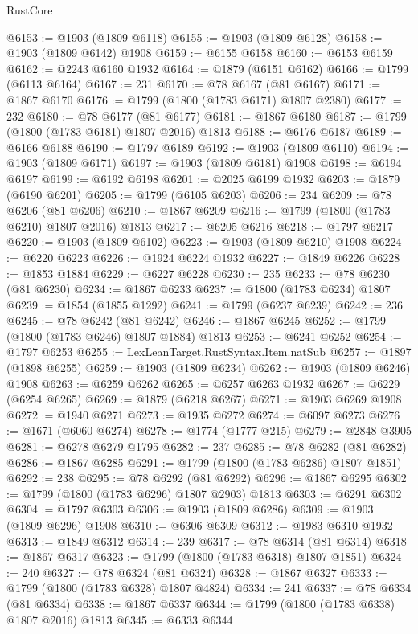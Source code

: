 \begin{lexlean}{RustCore}
\begin{coremodule}
@6153 := @1903 (@1809 @6118)
@6155 := @1903 (@1809 @6128)
@6158 := @1903 (@1809 @6142) @1908
@6159 := @6155 @6158
@6160 := @6153 @6159
@6162 := @2243 @6160 @1932
@6164 := @1879 (@6151 @6162)
@6166 := @1799 (@6113 @6164)
@6167 := 231
@6170 := @78 @6167 (@81 @6167)
@6171 := @1867 @6170
@6176 := @1799 (@1800 (@1783 @6171) @1807 @2380)
@6177 := 232
@6180 := @78 @6177 (@81 @6177)
@6181 := @1867 @6180
@6187 := @1799 (@1800 (@1783 @6181) @1807 @2016) @1813
@6188 := @6176 @6187
@6189 := @6166 @6188
@6190 := @1797 @6189
@6192 := @1903 (@1809 @6110)
@6194 := @1903 (@1809 @6171)
@6197 := @1903 (@1809 @6181) @1908
@6198 := @6194 @6197
@6199 := @6192 @6198
@6201 := @2025 @6199 @1932
@6203 := @1879 (@6190 @6201)
@6205 := @1799 (@6105 @6203)
@6206 := 234
@6209 := @78 @6206 (@81 @6206)
@6210 := @1867 @6209
@6216 := @1799 (@1800 (@1783 @6210) @1807 @2016) @1813
@6217 := @6205 @6216
@6218 := @1797 @6217
@6220 := @1903 (@1809 @6102)
@6223 := @1903 (@1809 @6210) @1908
@6224 := @6220 @6223
@6226 := @1924 @6224 @1932
@6227 := @1849 @6226
@6228 := @1853 @1884
@6229 := @6227 @6228
@6230 := 235
@6233 := @78 @6230 (@81 @6230)
@6234 := @1867 @6233
@6237 := @1800 (@1783 @6234) @1807
@6239 := @1854 (@1855 @1292)
@6241 := @1799 (@6237 @6239)
@6242 := 236
@6245 := @78 @6242 (@81 @6242)
@6246 := @1867 @6245
@6252 := @1799 (@1800 (@1783 @6246) @1807 @1884) @1813
@6253 := @6241 @6252
@6254 := @1797 @6253
@6255 := LexLeanTarget.RustSyntax.Item.natSub
@6257 := @1897 (@1898 @6255)
@6259 := @1903 (@1809 @6234)
@6262 := @1903 (@1809 @6246) @1908
@6263 := @6259 @6262
@6265 := @6257 @6263 @1932
@6267 := @6229 (@6254 @6265)
@6269 := @1879 (@6218 @6267)
@6271 := @1903 @6269 @1908
@6272 := @1940 @6271
@6273 := @1935 @6272
@6274 := @6097 @6273
@6276 := @1671 (@6060 @6274)
@6278 := @1774 (@1777 @215)
@6279 := @2848 @3905
@6281 := @6278 @6279 @1795
@6282 := 237
@6285 := @78 @6282 (@81 @6282)
@6286 := @1867 @6285
@6291 := @1799 (@1800 (@1783 @6286) @1807 @1851)
@6292 := 238
@6295 := @78 @6292 (@81 @6292)
@6296 := @1867 @6295
@6302 := @1799 (@1800 (@1783 @6296) @1807 @2903) @1813
@6303 := @6291 @6302
@6304 := @1797 @6303
@6306 := @1903 (@1809 @6286)
@6309 := @1903 (@1809 @6296) @1908
@6310 := @6306 @6309
@6312 := @1983 @6310 @1932
@6313 := @1849 @6312
@6314 := 239
@6317 := @78 @6314 (@81 @6314)
@6318 := @1867 @6317
@6323 := @1799 (@1800 (@1783 @6318) @1807 @1851)
@6324 := 240
@6327 := @78 @6324 (@81 @6324)
@6328 := @1867 @6327
@6333 := @1799 (@1800 (@1783 @6328) @1807 @4824)
@6334 := 241
@6337 := @78 @6334 (@81 @6334)
@6338 := @1867 @6337
@6344 := @1799 (@1800 (@1783 @6338) @1807 @2016) @1813
@6345 := @6333 @6344

\end{coremodule}
\end{lexlean}
